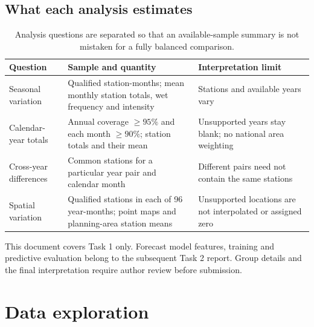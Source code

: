 \documentclass[10pt,a4paper]{article}
\begin{document}
\subsection{What each analysis estimates}
\begin{table}[H]\small\centering
\begin{tabular}{p{.22\linewidth}p{.34\linewidth}p{.34\linewidth}}\toprule Question & Sample and quantity & Interpretation limit\\\midrule
Seasonal variation & Qualified station-months; mean monthly station totals, wet frequency and intensity & Stations and available years vary\\
Calendar-year totals & Annual coverage $\geq95\%$ and each month $\geq90\%$; station totals and their mean & Unsupported years stay blank; no national area weighting\\
Cross-year differences & Common stations for a particular year pair and calendar month & Different pairs need not contain the same stations\\
Spatial variation & Qualified stations in each of 96 year-months; point maps and planning-area station means & Unsupported locations are not interpolated or assigned zero\\\bottomrule
\end{tabular}\caption{Analysis questions are separated so that an available-sample summary is not mistaken for a fully balanced comparison.}\end{table}

This document covers Task 1 only. Forecast model features, training and predictive evaluation belong to the subsequent Task 2 report. Group details and the final interpretation require author review before submission.

\clearpage
\section{Data exploration}
\end{document}
